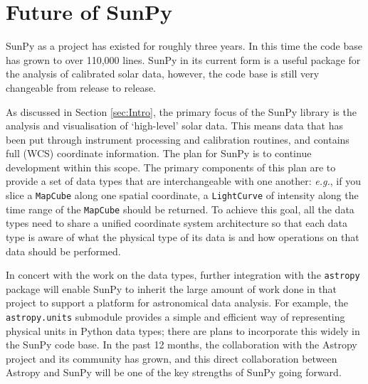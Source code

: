 \section{Future of SunPy}\label{sec:future}
SunPy as a project has existed for roughly three years. In this time 
the code 
base has grown to over 110,000 lines. SunPy in its current form is a 
useful 
package for the analysis of calibrated solar data, however, the code 
base is 
still very changeable from release to release.

As discussed in Section \ref{sec:Intro}, the primary focus of the 
SunPy library is the analysis and visualisation of `high-level' solar 
data. This means data that has been put through instrument processing 
and 
calibration routines, and contains full (WCS) coordinate information. 
The plan for SunPy is to continue development within this 
scope. The 
primary components of this plan are to provide a set of data types 
that are 
interchangeable with one another: \textit{e.g.}, if you slice a 
\texttt{MapCube} 
along one spatial coordinate, a \texttt{LightCurve} of intensity along the 
time range of 
the \texttt{MapCube} should be returned. To achieve this goal, all the 
data 
types need to share a unified coordinate system architecture so that 
each data 
type is aware of what the physical type of its data is and how 
operations on 
that data should be performed.

In concert with the work on the data types, further integration with 
the 
\texttt{astropy} package will enable SunPy to inherit the large 
amount of work 
done in that project to support a platform for astronomical data 
analysis. For 
example, the \texttt{astropy.units} submodule provides a simple and 
efficient 
way of representing physical units in Python data types; there are 
plans to 
incorporate this widely in the SunPy code base. In the past 12 months, 
the 
collaboration with the Astropy project 
\citep{theastropycollaboration2013} and 
its community has grown, and this direct collaboration between Astropy 
and 
SunPy will be one of the key strengths of SunPy going forward.
